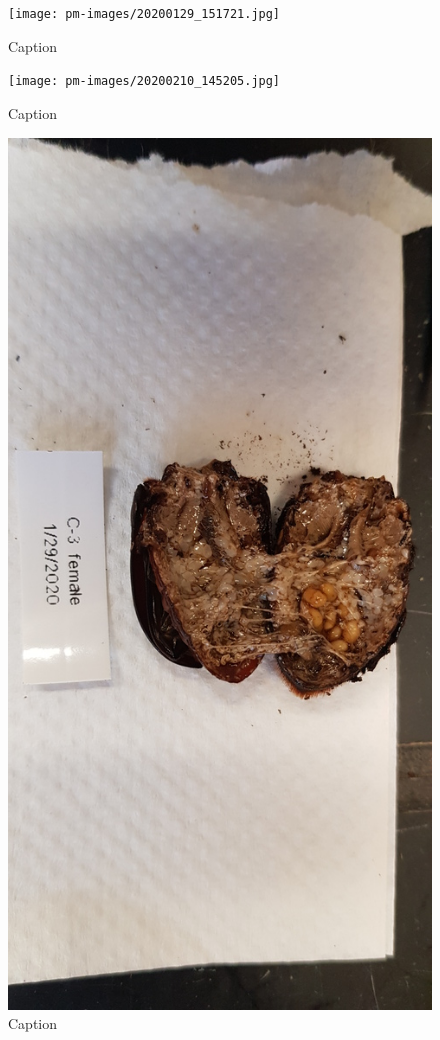 \begin{figure}[]
\centering
\texttt{[image: pm-images/20200129\_151721.jpg]}
\caption{Caption}
\end{figure}

        \clearpage
        
\begin{figure}[]
\centering
\texttt{[image: pm-images/20200210\_145205.jpg]}
\caption{Caption}
\end{figure}

        \clearpage
        
\begin{figure}[]
\centering
\includegraphics[width=\textwidth]{pm-images/20200129_161111.jpg}
\caption{Caption}
\end{figure}

